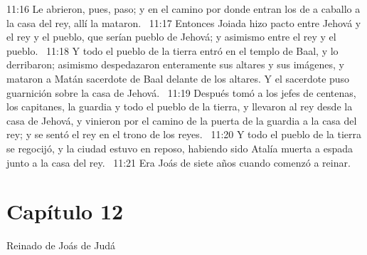 11:16 Le abrieron, pues, paso; y en el camino por donde entran los de a caballo a la casa del rey, allí la mataron.  
11:17 Entonces Joiada hizo pacto entre Jehová y el rey y el pueblo, que serían pueblo de Jehová; y asimismo entre el rey y el pueblo.  
11:18 Y todo el pueblo de la tierra entró en el templo de Baal, y lo derribaron; asimismo despedazaron enteramente sus altares y sus imágenes, y mataron a Matán sacerdote de Baal delante de los altares. Y el sacerdote puso guarnición sobre la casa de Jehová.  
11:19 Después tomó a los jefes de centenas, los capitanes, la guardia y todo el pueblo de la tierra, y llevaron al rey desde la casa de Jehová, y vinieron por el camino de la puerta de la guardia a la casa del rey; y se sentó el rey en el trono de los reyes.  
11:20 Y todo el pueblo de la tierra se regocijó, y la ciudad estuvo en reposo, habiendo sido Atalía muerta a espada junto a la casa del rey.  
11:21 Era Joás de siete años cuando comenzó a reinar.  
\section*{Capítulo 12}
Reinado de Joás de Judá  


